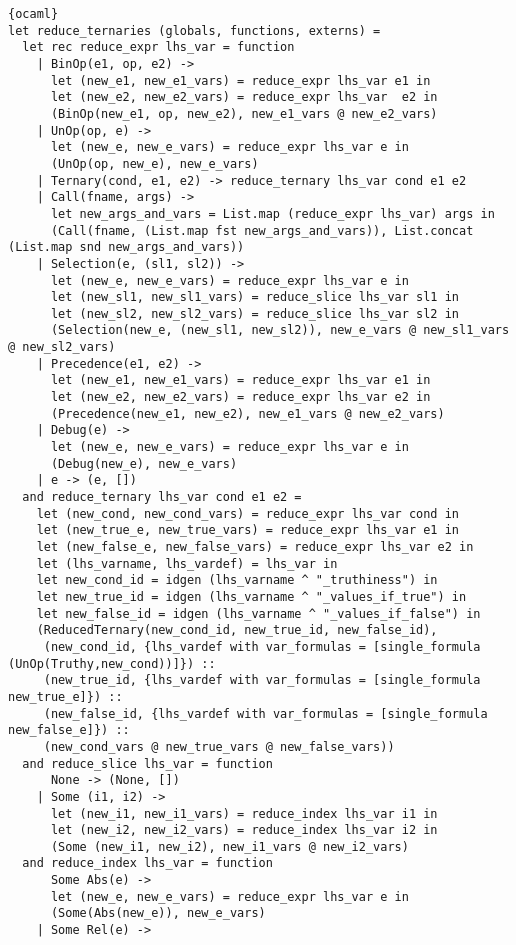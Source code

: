 \begin{lstlisting}{ocaml}
let reduce_ternaries (globals, functions, externs) =
  let rec reduce_expr lhs_var = function
    | BinOp(e1, op, e2) ->
      let (new_e1, new_e1_vars) = reduce_expr lhs_var e1 in
      let (new_e2, new_e2_vars) = reduce_expr lhs_var  e2 in
      (BinOp(new_e1, op, new_e2), new_e1_vars @ new_e2_vars)
    | UnOp(op, e) ->
      let (new_e, new_e_vars) = reduce_expr lhs_var e in
      (UnOp(op, new_e), new_e_vars)
    | Ternary(cond, e1, e2) -> reduce_ternary lhs_var cond e1 e2
    | Call(fname, args) ->
      let new_args_and_vars = List.map (reduce_expr lhs_var) args in
      (Call(fname, (List.map fst new_args_and_vars)), List.concat (List.map snd new_args_and_vars))
    | Selection(e, (sl1, sl2)) ->
      let (new_e, new_e_vars) = reduce_expr lhs_var e in
      let (new_sl1, new_sl1_vars) = reduce_slice lhs_var sl1 in
      let (new_sl2, new_sl2_vars) = reduce_slice lhs_var sl2 in
      (Selection(new_e, (new_sl1, new_sl2)), new_e_vars @ new_sl1_vars @ new_sl2_vars)
    | Precedence(e1, e2) ->
      let (new_e1, new_e1_vars) = reduce_expr lhs_var e1 in
      let (new_e2, new_e2_vars) = reduce_expr lhs_var e2 in
      (Precedence(new_e1, new_e2), new_e1_vars @ new_e2_vars)
    | Debug(e) ->
      let (new_e, new_e_vars) = reduce_expr lhs_var e in
      (Debug(new_e), new_e_vars)
    | e -> (e, [])
  and reduce_ternary lhs_var cond e1 e2 =
    let (new_cond, new_cond_vars) = reduce_expr lhs_var cond in
    let (new_true_e, new_true_vars) = reduce_expr lhs_var e1 in
    let (new_false_e, new_false_vars) = reduce_expr lhs_var e2 in
    let (lhs_varname, lhs_vardef) = lhs_var in
    let new_cond_id = idgen (lhs_varname ^ "_truthiness") in
    let new_true_id = idgen (lhs_varname ^ "_values_if_true") in
    let new_false_id = idgen (lhs_varname ^ "_values_if_false") in
    (ReducedTernary(new_cond_id, new_true_id, new_false_id),
     (new_cond_id, {lhs_vardef with var_formulas = [single_formula (UnOp(Truthy,new_cond))]}) ::
     (new_true_id, {lhs_vardef with var_formulas = [single_formula new_true_e]}) ::
     (new_false_id, {lhs_vardef with var_formulas = [single_formula new_false_e]}) ::
     (new_cond_vars @ new_true_vars @ new_false_vars))
  and reduce_slice lhs_var = function
      None -> (None, [])
    | Some (i1, i2) ->
      let (new_i1, new_i1_vars) = reduce_index lhs_var i1 in
      let (new_i2, new_i2_vars) = reduce_index lhs_var i2 in
      (Some (new_i1, new_i2), new_i1_vars @ new_i2_vars)
  and reduce_index lhs_var = function
      Some Abs(e) ->
      let (new_e, new_e_vars) = reduce_expr lhs_var e in
      (Some(Abs(new_e)), new_e_vars)
    | Some Rel(e) ->

\end{lstlisting}
